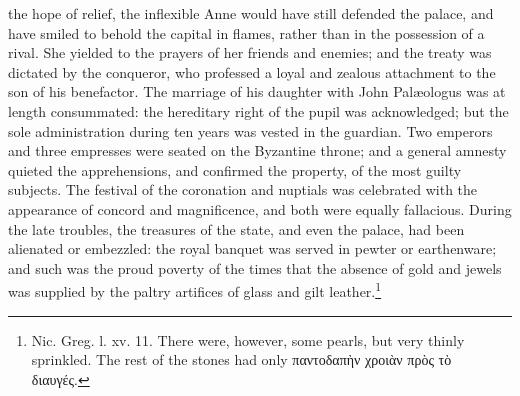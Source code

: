 the hope of relief, the inflexible Anne would have still defended the palace, and have smiled to behold the capital in flames, rather than in the possession of a rival. She yielded to the prayers of her friends and enemies; and the treaty was dictated by the conqueror, who professed a loyal and zealous attachment to the son of his benefactor. The marriage of his daughter with John Palæologus was at length consummated: the hereditary right of the pupil was acknowledged; but the sole administration during ten years was vested in the guardian. Two emperors and three empresses were seated on the Byzantine throne; and a general amnesty quieted the apprehensions, and confirmed the property, of the most guilty subjects. The festival of the coronation and nuptials was celebrated with the appearance of concord and magnificence, and both were equally fallacious. During the late troubles, the treasures of the state, and even the palace, had been alienated or embezzled: the royal banquet was served in pewter or earthenware; and such was the proud poverty of the times that the absence of gold and jewels was supplied by the paltry artifices of glass and gilt leather.\footnote{Nic. Greg. l. xv. 11. There were, however, some pearls, but very thinly sprinkled. The rest of the stones had only \textgreek{παντοδαπ\texthebrew{ὴ}ν χροι\texthebrew{ὰ}ν πρ\texthebrew{ὸ}ς τ\texthebrew{ὸ} διαυγές}.}

